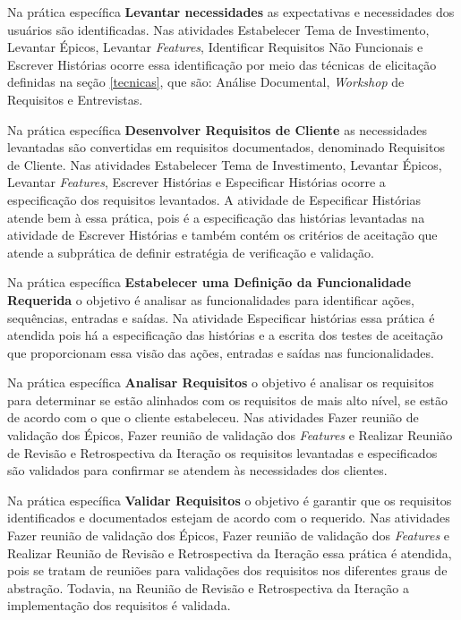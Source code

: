 Na prática específica \textbf{Levantar necessidades} as expectativas e necessidades dos usuários
são identificadas. Nas atividades Estabelecer Tema de Investimento, Levantar Épicos, 
Levantar \textit{Features}, Identificar Requisitos Não Funcionais e Escrever Histórias ocorre 
essa identificação por meio das técnicas de elicitação definidas na seção \ref{tecnicas}, que são: Análise
Documental, \textit{Workshop} de Requisitos e Entrevistas.

Na prática específica \textbf{Desenvolver Requisitos de Cliente} as necessidades levantadas são
convertidas em requisitos documentados, denominado Requisitos de Cliente. Nas atividades Estabelecer Tema de Investimento, Levantar Épicos, 
Levantar \textit{Features}, Escrever Histórias e Especificar Histórias ocorre 
a especificação dos requisitos levantados. A atividade de Especificar Histórias
atende bem à essa prática, pois é a especificação das histórias levantadas na atividade
de Escrever Histórias e também contém os critérios de aceitação que atende a subprática
de definir estratégia de verificação e validação.

Na prática específica \textbf{Estabelecer uma Definição da Funcionalidade Requerida}
o objetivo é analisar as funcionalidades para identificar ações, sequências, entradas e saídas.
Na atividade Especificar histórias essa prática é atendida pois há a especificação
das histórias e a escrita dos testes de aceitação que proporcionam essa visão das ações,
entradas e saídas nas funcionalidades.

Na prática específica \textbf{Analisar Requisitos} o objetivo é analisar os requisitos
para determinar se estão alinhados com os requisitos de mais alto nível, se estão de acordo
com o que o cliente estabeleceu. Nas atividades Fazer reunião de validação dos Épicos,
Fazer reunião de validação dos \textit{Features} e Realizar Reunião de Revisão e Retrospectiva da Iteração
os requisitos levantadas e especificados são validados para confirmar se atendem às necessidades
dos clientes. 

Na prática específica \textbf{Validar Requisitos} o objetivo é garantir que os requisitos 
identificados e documentados estejam de acordo com o requerido. Nas atividades Fazer reunião de validação dos Épicos,
Fazer reunião de validação dos \textit{Features} e Realizar Reunião de Revisão e Retrospectiva da Iteração
essa prática é atendida, pois se tratam de reuniões para validações dos requisitos
nos diferentes graus de abstração. Todavia, na Reunião de Revisão e Retrospectiva da Iteração
a implementação dos requisitos é validada.